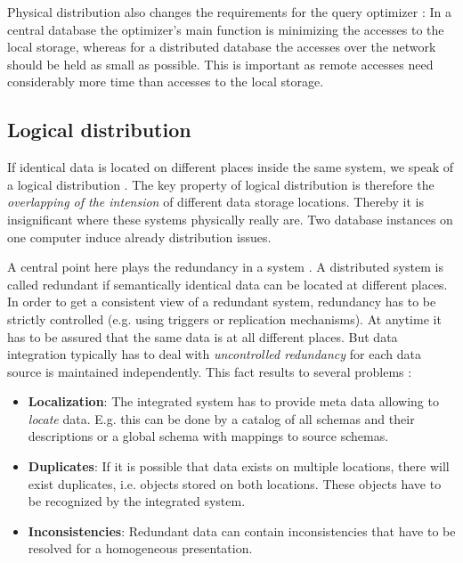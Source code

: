 Physical distribution also changes the requirements for the query optimizer \cite[p. 52]{DBLP:books/dp/LeserN2006}: In a central database the optimizer's main function is minimizing  the accesses to the local storage, whereas for a distributed database the accesses over the network should be held as small as possible. This is important as remote accesses need considerably more time than accesses to the local storage.  

\subsection{Logical distribution}
If identical data is located on different places inside the same system, we speak of a logical distribution \cite[p. 52]{DBLP:books/dp/LeserN2006}. The key property of logical distribution is therefore the \textit{overlapping of the intension} of different data storage locations. Thereby it is insignificant where these systems physically really are. Two database instances on one computer induce already distribution issues.

A central point here plays the redundancy in a system \cite[p. 53]{DBLP:books/dp/LeserN2006}. A distributed system is called redundant if semantically identical data can be located at different places. In order to get a consistent view of a redundant system, redundancy has to be strictly controlled (e.g. using triggers or replication mechanisms). At anytime it has to be assured that the same data is at all different places. 
But data integration typically has to deal with \textit{uncontrolled redundancy} for each data source is maintained independently. This fact results to several problems \cite[p. 53]{DBLP:books/dp/LeserN2006}:
\begin{itemize}
\item \textbf{Localization}: The integrated system has to provide meta data allowing to \textit{locate} data. E.g. this can be done by a catalog of all schemas and their descriptions or a global schema with mappings to source schemas.
\item \textbf{Duplicates}: If it is possible that data exists on multiple locations, there will exist duplicates, i.e. objects stored on both locations. These objects have to be recognized by the integrated system.
\item \textbf{Inconsistencies}: Redundant data can contain inconsistencies that have to be resolved for a homogeneous presentation.
\end{itemize}

